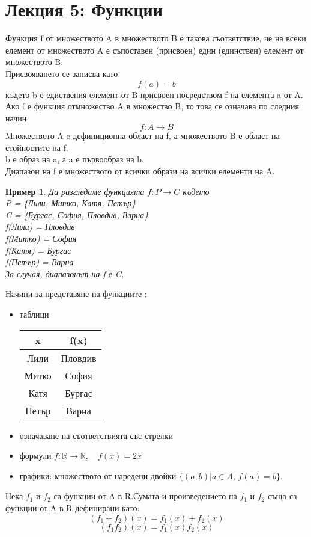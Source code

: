 \documentclass[fleqn, 12pt]{article}
\newtheorem{example}{Пример}[subsection]
\begin{document}
\section{Лекция 5: Функции}
Функция f от множеството A в множеството B е такова съответствие, че на всеки  елемент от множеството A е съпоставен (присвоен) един (единствен) елемент от множеството B.\\
Присвояването се записва като 
$$f(a) = b$$ 
където b е едиствения елемент от B присвоен посредством f на елемента a от A. Ако f е функция отмножество A в множество B, то това се означава по следния начин 
$$f: A \rightarrow B$$
Mножеството A  e дефиниционна област на f, а множеството B е област на стойностите на f. \\
b е образ на a, а a е първообраз на b. \\
Диапазон на f е множеството от всички образи на всички  елементи на A.\\
\begin{example}
Да разгледаме функцията $f: P \rightarrow C$ където \\
P = \{Лили, Митко, Катя, Петър\} \\
C = \{Бургас, София, Пловдив, Варна\}\\
f(Лили) = Пловдив \\
f(Митко) = София \\
f(Катя) = Бургас \\
f(Петър) = Варна \\
За случая, диапазонът на f е C. 
\end{example}
Начини за представяне на функциите :

\begin{itemize}
\item таблици 
\begin{table}[h!]
  \begin{center}
    \begin{tabular}{|c|c|} 
\hline
      \textbf{x} & \textbf{f(x)}\\
\hline
	Лили & Пловдив  \\ 
\hline
	Митко & София  \\
\hline
	Катя & Бургас \\
\hline
 	Петър & Варна \\  
\hline
    \end{tabular}
  \end{center}
\end{table}
\item означаване на съответствията със стрелки 
\item формули $f:\mathbb{R} \rightarrow \mathbb{R}, \quad f(x) = 2x$
\item графики: множеството от наредени двойки $ \{(a, b) | a \in A, \, f(a) = b\}$.
\end{itemize}
Нека $f_1$ и $f_2$ са функции от A в R.Сумата и произведението на $f_1$ и $f_2$ също са функции от A в R дефинирани като:
$$(f_1+ f_2)(x) =  f_1(x) + f_2(x)$$
$$(f_1f_2)(x) =  f_1(x) f_2(x)$$
\end{document}
